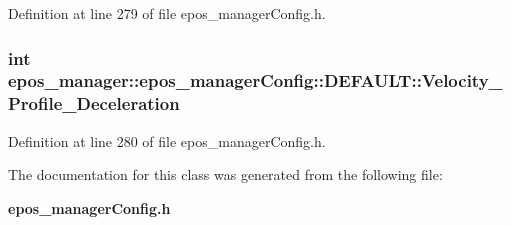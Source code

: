 \-Definition at line 279 of file epos\-\_\-manager\-Config.\-h.

\subsubsection[{\-Velocity\-\_\-\-Profile\-\_\-\-Deceleration}]{\setlength{\rightskip}{0pt plus 5cm}int {\bf epos\-\_\-manager\-::epos\-\_\-manager\-Config\-::\-D\-E\-F\-A\-U\-L\-T\-::\-Velocity\-\_\-\-Profile\-\_\-\-Deceleration}}\label{classepos__manager_1_1epos__managerConfig_1_1DEFAULT_a8ae9ca4777d15fb059c050933d07dc1f}


\-Definition at line 280 of file epos\-\_\-manager\-Config.\-h.



\-The documentation for this class was generated from the following file\-:\begin{DoxyCompactItemize}
\item 
{\bf epos\-\_\-manager\-Config.\-h}\end{DoxyCompactItemize}
